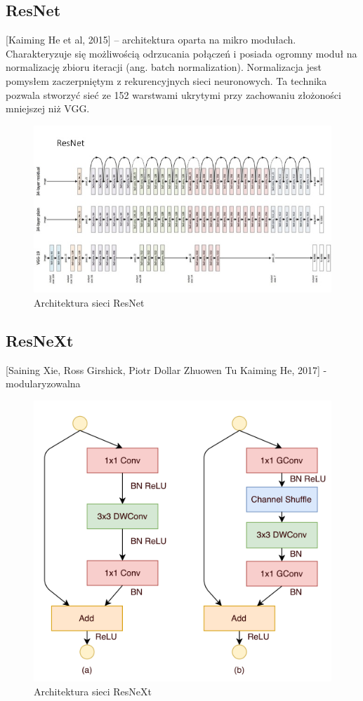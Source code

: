 \documentclass[12pt,a4paper,twoside,titlepage,openright]{book}
\begin{document}
\subsection{ResNet}
[Kaiming He et al, 2015] -- architektura oparta na mikro modułach. Charakteryzuje się możliwością odrzucania połączeń i posiada ogromny moduł na normalizację zbioru iteracji (ang. batch normalization). Normalizacja jest pomysłem zaczerpniętym z rekurencyjnych sieci neuronowych. Ta technika pozwala stworzyć sieć ze 152 warstwami ukrytymi przy zachowaniu złożoności mniejszej niż VGG. \cite{DBLP:journals/corr/XieGDTH16}
\begin{figure}[h]
	\centering
			\includegraphics[resolution=100]{ResNet.png}
		\caption{Architektura sieci ResNet}
\end{figure}

\subsection{ResNeXt}
[Saining Xie, Ross Girshick, Piotr Dollar Zhuowen Tu Kaiming He, 2017] - modularyzowalna 
\cite{DBLP:journals/corr/XieGDTH16}
\begin{figure}[h]
	\centering
			\includegraphics[resolution=120]{ResNeXt.png}
		\caption{Architektura sieci ResNeXt}
\end{figure}
\end{document}
